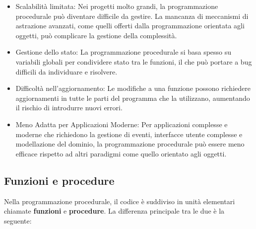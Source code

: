 \documentclass[
  letterpaper,
  DIV=11,
  numbers=noendperiod]{scrreprt}
\providecommand{\tightlist}{%
  \setlength{\itemsep}{0pt}\setlength{\parskip}{0pt}}\usepackage{longtable,booktabs,array}
\begin{document}
\begin{itemize}
\tightlist
\item
  Scalabilità limitata: Nei progetti molto grandi, la programmazione
  procedurale può diventare difficile da gestire. La mancanza di
  meccanismi di astrazione avanzati, come quelli offerti dalla
  programmazione orientata agli oggetti, può complicare la gestione
  della complessità.
\item
  Gestione dello stato: La programmazione procedurale si basa spesso su
  variabili globali per condividere stato tra le funzioni, il che può
  portare a bug difficili da individuare e risolvere.
\item
  Difficoltà nell'aggiornamento: Le modifiche a una funzione possono
  richiedere aggiornamenti in tutte le parti del programma che la
  utilizzano, aumentando il rischio di introdurre nuovi errori.
\item
  Meno Adatta per Applicazioni Moderne: Per applicazioni complesse e
  moderne che richiedono la gestione di eventi, interfacce utente
  complesse e modellazione del dominio, la programmazione procedurale
  può essere meno efficace rispetto ad altri paradigmi come quello
  orientato agli oggetti.
\end{itemize}

\subsection{Funzioni e procedure}\label{funzioni-e-procedure}

Nella programmazione procedurale, il codice è suddiviso in unità
elementari chiamate \textbf{funzioni} e \textbf{procedure}. La
differenza principale tra le due è la seguente:
\end{document}
